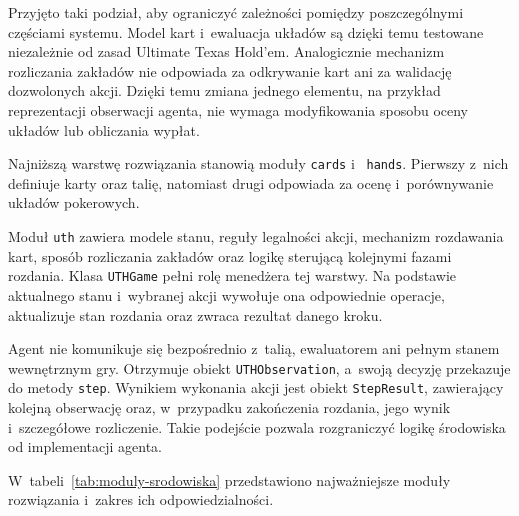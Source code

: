 Przyjęto taki podział, aby ograniczyć zależności pomiędzy poszczególnymi częściami
systemu. Model kart i~ewaluacja układów są dzięki temu testowane
niezależnie od zasad Ultimate Texas Hold’em. Analogicznie mechanizm
rozliczania zakładów nie odpowiada za odkrywanie kart ani za walidację
dozwolonych akcji. Dzięki temu zmiana jednego elementu, na przykład
reprezentacji obserwacji agenta, nie wymaga modyfikowania sposobu oceny
układów lub obliczania wypłat.

Najniższą warstwę rozwiązania stanowią moduły \texttt{cards} i~
\texttt{hands}. Pierwszy z~nich definiuje karty oraz talię, natomiast drugi
odpowiada za ocenę i~porównywanie układów pokerowych.

Moduł \texttt{uth} zawiera modele stanu,
reguły legalności akcji, mechanizm rozdawania kart, sposób rozliczania
zakładów oraz logikę sterującą kolejnymi fazami rozdania. Klasa
\texttt{UTHGame} pełni rolę menedżera tej warstwy. Na podstawie aktualnego
stanu i~wybranej akcji wywołuje ona odpowiednie operacje, aktualizuje stan
rozdania oraz zwraca rezultat danego kroku.

Agent nie komunikuje się bezpośrednio z~talią, ewaluatorem ani pełnym stanem
wewnętrznym gry. Otrzymuje obiekt \texttt{UTHObservation}, a~swoją decyzję
przekazuje do metody \texttt{step}. Wynikiem wykonania akcji jest obiekt
\texttt{StepResult}, zawierający kolejną obserwację oraz, w~przypadku
zakończenia rozdania, jego wynik i~szczegółowe rozliczenie. Takie podejście
pozwala rozgraniczyć logikę środowiska od implementacji agenta.

W~tabeli~\ref{tab:moduly-srodowiska} przedstawiono najważniejsze moduły
rozwiązania i~zakres ich odpowiedzialności.

